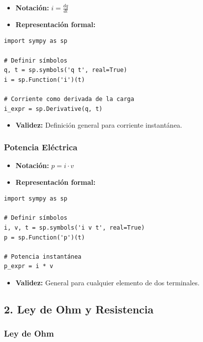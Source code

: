 \documentclass[11pt,a4paper]{article}
\begin{document}
\begin{itemize}[leftmargin=*,topsep=2pt,itemsep=1pt]
  \item \textbf{Notación:} $i = \frac{dq}{dt}$
  \item \textbf{Representación formal:}
\end{itemize}


\begin{lstlisting}
import sympy as sp

# Definir símbolos
q, t = sp.symbols('q t', real=True)
i = sp.Function('i')(t)

# Corriente como derivada de la carga
i_expr = sp.Derivative(q, t)
\end{lstlisting}


\begin{itemize}[leftmargin=*,topsep=2pt,itemsep=1pt]
  \item \textbf{Validez:} Definición general para corriente instantánea.
\end{itemize}


\subsubsection*{Potencia Eléctrica}


\begin{itemize}[leftmargin=*,topsep=2pt,itemsep=1pt]
  \item \textbf{Notación:} $p = i \cdot v$
  \item \textbf{Representación formal:}
\end{itemize}


\begin{lstlisting}
import sympy as sp

# Definir símbolos
i, v, t = sp.symbols('i v t', real=True)
p = sp.Function('p')(t)

# Potencia instantánea
p_expr = i * v
\end{lstlisting}


\begin{itemize}[leftmargin=*,topsep=2pt,itemsep=1pt]
  \item \textbf{Validez:} General para cualquier elemento de dos terminales.
\end{itemize}


\subsection*{2. Ley de Ohm y Resistencia}


\subsubsection*{Ley de Ohm}
\end{document}

